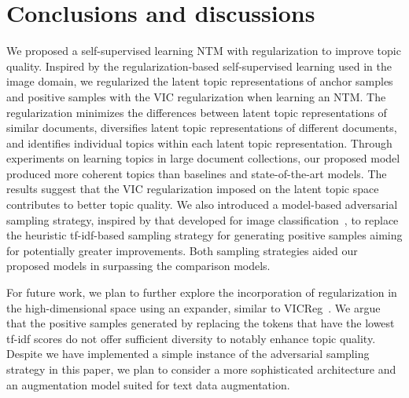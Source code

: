 \documentclass{article}
\begin{document}
\section{Conclusions and discussions}
We proposed a self-supervised learning NTM with regularization to improve topic quality.
Inspired by the regularization-based self-supervised learning used in the image domain, we regularized the latent topic representations of anchor samples and positive samples with the VIC regularization when learning an NTM.
The regularization minimizes the differences between latent topic representations of similar documents, diversifies latent topic representations of different documents, and identifies individual topics within each latent topic representation. 
Through experiments on learning topics in large document collections, our proposed model produced more coherent topics than baselines and state-of-the-art models.
The results suggest that the VIC regularization imposed on the latent topic space contributes to better topic quality.
We also introduced a model-based adversarial sampling strategy, inspired by that developed for image classification~\cite{Suzuki_2022_CVPR}, to replace the heuristic tf-idf-based sampling strategy for generating positive samples aiming for potentially greater improvements. Both sampling strategies aided our proposed models in surpassing the comparison models.

For future work, we plan to further explore the incorporation of regularization in the high-dimensional space using an expander, similar to VICReg~\cite{bardes2022vicreg}.
We argue that the positive samples generated by replacing the tokens that have the lowest tf-idf scores do not offer sufficient diversity to notably enhance topic quality. 
Despite we have implemented a simple instance of the adversarial sampling strategy in this paper, we plan to consider a more sophisticated architecture and an augmentation model suited for text data augmentation.
\end{document}
